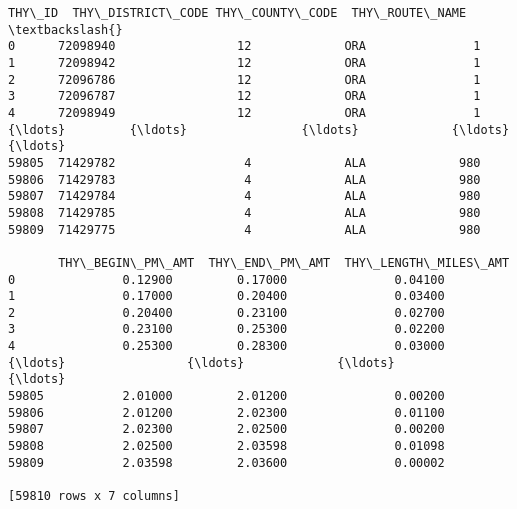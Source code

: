 \documentclass[11pt]{article}
\makeatletter
\newcommand{\boxspacing}{\kern\kvtcb@left@rule\kern\kvtcb@boxsep}
\newcommand{\prompt}[4]{
        {\ttfamily\llap{{\color{#2}[#3]:\hspace{3pt}#4}}\vspace{-\baselineskip}}
    }
\makeatother
\begin{document}
            \begin{tcolorbox}[breakable, size=fbox, boxrule=.5pt, pad at break*=1mm, opacityfill=0]
\prompt{Out}{outcolor}{9}{\boxspacing}
\begin{Verbatim}[commandchars=\\\{\}]
         THY\_ID  THY\_DISTRICT\_CODE THY\_COUNTY\_CODE  THY\_ROUTE\_NAME  \textbackslash{}
0      72098940                 12             ORA               1
1      72098942                 12             ORA               1
2      72096786                 12             ORA               1
3      72096787                 12             ORA               1
4      72098949                 12             ORA               1
{\ldots}         {\ldots}                {\ldots}             {\ldots}             {\ldots}
59805  71429782                  4             ALA             980
59806  71429783                  4             ALA             980
59807  71429784                  4             ALA             980
59808  71429785                  4             ALA             980
59809  71429775                  4             ALA             980

       THY\_BEGIN\_PM\_AMT  THY\_END\_PM\_AMT  THY\_LENGTH\_MILES\_AMT
0               0.12900         0.17000               0.04100
1               0.17000         0.20400               0.03400
2               0.20400         0.23100               0.02700
3               0.23100         0.25300               0.02200
4               0.25300         0.28300               0.03000
{\ldots}                 {\ldots}             {\ldots}                   {\ldots}
59805           2.01000         2.01200               0.00200
59806           2.01200         2.02300               0.01100
59807           2.02300         2.02500               0.00200
59808           2.02500         2.03598               0.01098
59809           2.03598         2.03600               0.00002

[59810 rows x 7 columns]
\end{Verbatim}
\end{tcolorbox}
        
\end{document}
